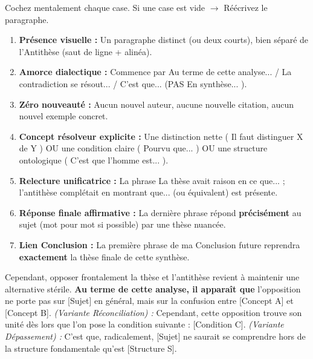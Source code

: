 \documentclass[11pt]{article}
\begin{document}
\begin{methode}
Cochez mentalement chaque case. Si une case est vide $\rightarrow$ Réécrivez le paragraphe.
\begin{enumerate}
    \item [ ] \textbf{Présence visuelle :} Un paragraphe distinct (ou deux courts), bien séparé de l'Antithèse (saut de ligne + alinéa).
    \item [ ] \textbf{Amorce dialectique :} Commence par \og{} Au terme de cette analyse... \fg{} / \og{} La contradiction se résout... \fg{} / \og{} C'est que... \fg{} (PAS \og{} En synthèse... \fg{}).
    \item [ ] \textbf{Zéro nouveauté :} Aucun nouvel auteur, aucune nouvelle citation, aucun nouvel exemple concret.
    \item [ ] \textbf{Concept résolveur explicite :} Une distinction nette (\og{} Il faut distinguer X de Y \fg{}) OU une condition claire (\og{} Pourvu que... \fg{}) OU une structure ontologique (\og{} C'est que l'homme est... \fg{}).
    \item [ ] \textbf{Relecture unificatrice :} La phrase \og{} La thèse avait raison en ce que... ; l'antithèse complétait en montrant que... \fg{} (ou équivalent) est présente.
    \item [ ] \textbf{Réponse finale affirmative :} La dernière phrase répond \textbf{précisément} au sujet (mot pour mot si possible) par une thèse nuancée.
    \item [ ] \textbf{Lien Conclusion :} La première phrase de ma Conclusion future reprendra \textbf{exactement} la thèse finale de cette synthèse.
\end{enumerate}
\end{methode}

\begin{exemplebox}
\og{} Cependant, opposer frontalement la thèse et l'antithèse revient à maintenir une alternative stérile. \textbf{Au terme de cette analyse, il apparaît que} l'opposition ne porte pas sur [Sujet] en général, mais sur la confusion entre [Concept A] et [Concept B]. \fg{}
\emph{(Variante Réconciliation) :} \og{} Cependant, cette opposition trouve son unité dès lors que l'on pose la condition suivante : [Condition C]. \fg{}
\emph{(Variante Dépassement) :} \og{} C'est que, radicalement, [Sujet] ne saurait se comprendre hors de la structure fondamentale qu'est [Structure S]. \fg{}
\end{exemplebox}
\end{document}
